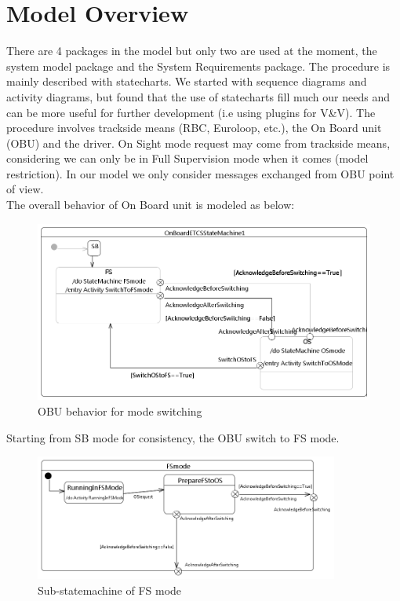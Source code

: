 \documentclass{template/openetcs_article}
\begin{document}
\section{Model Overview}
There are 4 packages in the model but only two are used at the moment, the system model package and the System Requirements package.
The procedure is mainly described with statecharts. We started with sequence diagrams and activity diagrams, but found that the use of statecharts fill much our needs and can be more useful for further development (i.e using plugins for V\&V).
The procedure involves trackside means (RBC, Euroloop, etc.), the On Board unit (OBU) and the driver. On Sight mode request may come from trackside means, considering we can only be in Full Supervision mode when it comes (model restriction). In our model we only consider messages exchanged from OBU point of view.
\\
The overall behavior of On Board unit is modeled as below:
\begin{figure}[h]
  \centering
  \includegraphics[width=14cm]{fig5_OBU_Behavior_mode_switching.png}
  \caption{OBU behavior for mode switching}
  \label{fig: OBU behavior for mode switching}
\end{figure}

Starting from SB mode for consistency, the OBU switch to FS mode. 

\begin{figure}[h]
  \centering
  \includegraphics[width=10cm]{fig6_state_machine_fsmode.png}
  \caption{Sub-statemachine of FS mode}
  \label{fig: Sub-statemachine of FS mode}
\end{figure}
\end{document}
